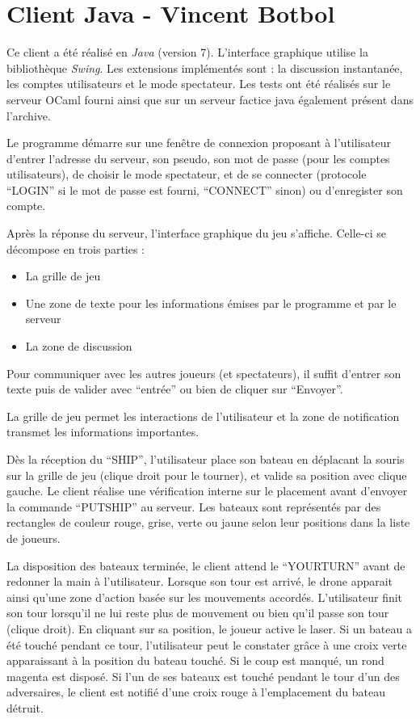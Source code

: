 \documentclass[a4paper, 11pt]{report}
\begin{document}
\chapter{Client Java - Vincent Botbol}


Ce client a été réalisé en \emph{Java} (version 7). L'interface graphique utilise 
la bibliothèque \emph{Swing}. Les extensions implémentés sont : la discussion instantanée,
les comptes utilisateurs et le mode spectateur. Les tests ont été réalisés sur le serveur OCaml
fourni ainsi que sur un serveur factice java également présent dans l'archive.

Le programme démarre sur une fenêtre de connexion proposant à l'utilisateur d'entrer
l'adresse du serveur, son pseudo, son mot de passe (pour les comptes utilisateurs), de choisir
le mode spectateur, et de se connecter (protocole ``LOGIN'' si le mot de passe est fourni, ``CONNECT'' sinon) ou d'enregister son compte.

Après la réponse du serveur, l'interface graphique du jeu s'affiche. Celle-ci se décompose en
trois parties :
\begin{itemize}
  \item La grille de jeu
  \item Une zone de texte pour les informations émises par le programme et par le serveur
  \item La zone de discussion
\end{itemize}\medskip{}

Pour communiquer avec les autres joueurs (et spectateurs), il suffit d'entrer son texte 
puis de valider avec ``entrée'' ou bien de cliquer sur ``Envoyer''.

La grille de jeu permet les interactions de l'utilisateur et la zone de notification transmet les
informations importantes.

Dès la réception du ``SHIP'', l'utilisateur place son bateau en déplacant la souris sur la grille
de jeu (clique droit pour le tourner), et valide sa position avec clique gauche. Le client
réalise une vérification interne sur le placement avant d'envoyer la commande ``PUTSHIP'' au serveur.
Les bateaux sont représentés par des rectangles de couleur rouge, grise, verte ou jaune selon
leur positions dans la liste de joueurs.

La disposition des bateaux terminée, le client attend le ``YOURTURN'' avant de redonner la main 
à l'utilisateur. Lorsque son tour est arrivé, le drone apparait ainsi qu'une zone d'action basée
sur les mouvements accordés. L'utilisateur finit son tour lorsqu'il ne lui reste plus de mouvement
ou bien qu'il passe son tour (clique droit). En cliquant sur sa position, le joueur active le laser.
Si un bateau a été touché pendant ce tour, l'utilisateur peut le constater grâce à une
croix verte apparaissant à la position du bateau touché. Si le coup est manqué, un rond magenta
est disposé. Si l'un de ses bateaux est touché pendant le tour d'un des adversaires, le client est
notifié d'une croix rouge à l'emplacement du bateau détruit.
\end{document}

